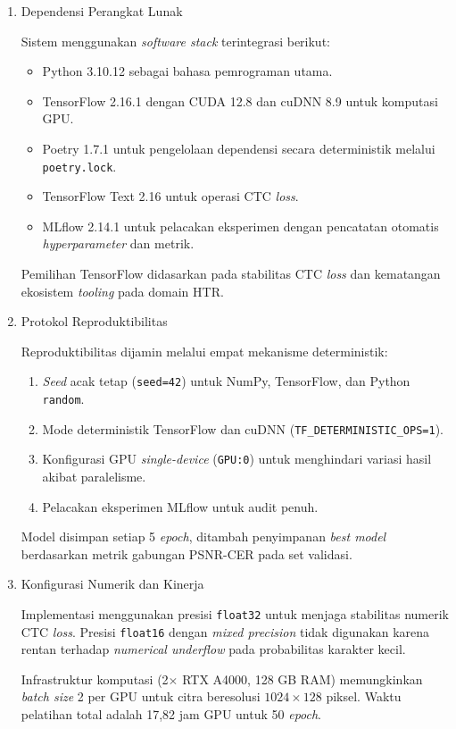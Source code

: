 \begin{enumerate}[label=\arabic*., leftmargin=*, wide=0pt, itemsep=1em]
    \item Dependensi Perangkat Lunak
    
    Sistem menggunakan \textit{software stack} terintegrasi berikut:
    \begin{itemize}[leftmargin=1.5em, labelsep=0.5em, noitemsep, topsep=0pt]
      \item Python 3.10.12 sebagai bahasa pemrograman utama.
      \item TensorFlow 2.16.1 dengan CUDA 12.8 dan cuDNN 8.9 untuk komputasi GPU.
      \item Poetry 1.7.1 untuk pengelolaan dependensi secara deterministik melalui \texttt{poetry.lock}.
      \item TensorFlow Text 2.16 untuk operasi CTC \textit{loss}.
      \item MLflow 2.14.1 untuk pelacakan eksperimen dengan pencatatan otomatis \textit{hyperparameter} dan metrik.
    \end{itemize}
    
    Pemilihan TensorFlow didasarkan pada stabilitas CTC \textit{loss} dan kematangan ekosistem \textit{tooling} pada domain HTR.
    
    \item Protokol Reproduktibilitas
    
    Reproduktibilitas dijamin melalui empat mekanisme deterministik:
    \begin{enumerate}[label=\alph*., leftmargin=1.5em, labelsep=0.5em, noitemsep, topsep=0pt]
      \item \textit{Seed} acak tetap (\texttt{seed=42}) untuk NumPy, TensorFlow, dan Python \texttt{random}.
      \item Mode deterministik TensorFlow dan cuDNN (\texttt{TF\_DETERMINISTIC\_OPS=1}).
      \item Konfigurasi GPU \textit{single-device} (\texttt{GPU:0}) untuk menghindari variasi hasil akibat paralelisme.
      \item Pelacakan eksperimen MLflow untuk audit penuh.
    \end{enumerate}
    
    Model disimpan setiap 5 \textit{epoch}, ditambah penyimpanan \textit{best model} berdasarkan metrik gabungan PSNR-CER pada set validasi.
    
    \item Konfigurasi Numerik dan Kinerja
    
    Implementasi menggunakan presisi \texttt{float32} untuk menjaga stabilitas numerik CTC \textit{loss}. Presisi \texttt{float16} dengan \textit{mixed precision} tidak digunakan karena rentan terhadap \textit{numerical underflow} pada probabilitas karakter kecil.
    
    Infrastruktur komputasi (2$\times$ RTX A4000, 128 GB RAM) memungkinkan \textit{batch size} 2 per GPU untuk citra beresolusi $1024 \times 128$ piksel. Waktu pelatihan total adalah 17,82 jam GPU untuk 50 \textit{epoch}.
\end{enumerate}

